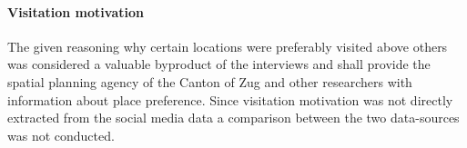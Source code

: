 \paragraph*{Visitation motivation}
The given reasoning why certain locations were preferably visited above others was considered a valuable byproduct of the interviews and shall provide the spatial planning agency of the Canton of Zug and other researchers with information about place preference. Since visitation motivation was not directly extracted from the social media data a comparison between the two data-sources was not conducted.
















